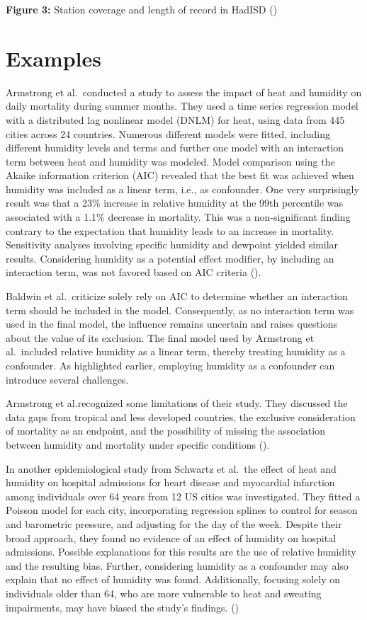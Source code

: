 \documentclass[
]{krantz}
\begin{document}
\textbf{Figure 3:} Station coverage and length of record in HadISD (\citet{raymond2024})

\section{Examples}\label{examples}

Armstrong et al.~conducted a study to assess the impact of heat and humidity on daily mortality during summer months. They used a time series regression model with a distributed lag nonlinear model (DNLM) for heat, using data from 445 cities across 24 countries. Numerous different models were fitted, including different humidity levels and terms and further one model with an interaction term between heat and humidity was modeled. Model comparison using the Akaike information criterion (AIC) revealed that the best fit was achieved when humidity was included as a linear term, i.e., as confounder. One very surprisingly result was that a 23\% increase in relative humidity at the 99th percentile was associated with a 1.1\% decrease in mortality. This was a non-significant finding contrary to the expectation that humidity leads to an increase in mortality. Sensitivity analyses involving specific humidity and dewpoint yielded similar results. Considering humidity as a potential effect modifier, by including an interaction term, was not favored based on AIC criteria (\citet{armstrong2019}).

Baldwin et al.~criticize solely rely on AIC to determine whether an interaction term should be included in the model. Consequently, as no interaction term was used in the final model, the influence remains uncertain and raises questions about the value of its exclusion. The final model used by Armstrong et al.~included relative humidity as a linear term, thereby treating humidity as a confounder. As highlighted earlier, employing humidity as a confounder can introduce several challenges.

Armstrong et al.recognized some limitations of their study. They discussed the data gaps from tropical and less developed countries, the exclusive consideration of mortality as an endpoint, and the possibility of missing the association between humidity and mortality under specific conditions (\citet{armstrong2019}).

In another epidemiological study from Schwartz et al.~the effect of heat and humidity on hospital admissions for heart disease and myocardial infarction among individuals over 64 years from 12 US cities was investigated. They fitted a Poisson model for each city, incorporating regression splines to control for season and barometric pressure, and adjusting for the day of the week. Despite their broad approach, they found no evidence of an effect of humidity on hospital admissions. Possible explanations for this results are the use of relative humidity and the resulting bias. Further, considering humidity as a confounder may also explain that no effect of humidity was found. Additionally, focusing solely on individuals older than 64, who are more vulnerable to heat and sweating impairments, may have biased the study's findings. (\citet{schwartz2004})
\end{document}
